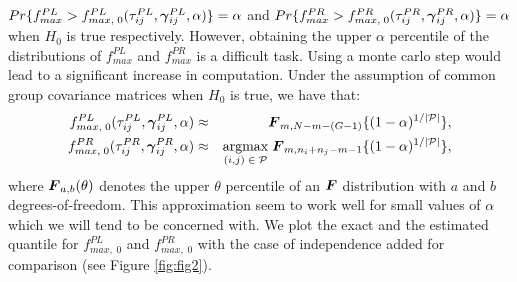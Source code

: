\documentclass[times,sort&compress,3p]{elsarticle}
\theoremstyle{plain}%
\theoremstyle{definition}
\def\be{\begin{eqnarray}}
\def\ee{\end{eqnarray}}
\newcommand{\uF}       {\mbox{\boldmath$F$}}
\newcommand{\ugamma}            {\mbox{\boldmath$\gamma$}}
\begin{document}
$Pr\{f^{PL}_{max} > f^{PL}_{max,\;0}(\tau^{PL}_{ij},\ugamma^{PL}_{ij}, \alpha)\} = \alpha$ and $Pr\{f^{PR}_{max} > f^{PR}_{max,\;0}(\tau^{PR}_{ij},\ugamma^{PR}_{ij}, \alpha)\} = \alpha$ when $H_{0}$ is true respectively. However, obtaining the upper $\alpha$ percentile of the distributions of $f^{PL}_{max}$ and $f^{PR}_{max}$ is a difficult task. Using a monte carlo step would lead to a significant increase in computation. Under the assumption of common group covariance matrices when $H_0$ is true, we have that: 
\be
 f^{PL}_{max,\;0}(\tau^{PL}_{ij},\ugamma^{PL}_{ij}, \alpha) &\approx& \uF_{m, N -m -(G-1)}\{(1 - \alpha)^{1/|\mathcal{P}|}\}, \nonumber\\
 f^{PR}_{max,\;0}(\tau^{PR}_{ij},\ugamma^{PR}_{ij}, \alpha) &\approx& \underset{(i,j)\; \in\; %
 \mathcal{P}}{\mathrm{argmax}}\; \uF_{m, n_{i}+n_{j} -m -1}\{ (1 -\alpha)^{1/|\mathcal{P}|}\}, \nonumber
 \ee
where $\uF_{a, b}(\theta)$ denotes the upper $\theta$ percentile of an $\uF$ distribution with $a$ and $b$ degrees-of-freedom. This approximation seem to work well for small values of $\alpha$ which we will tend to be concerned with. We plot the exact and the estimated quantile for $f^{PL}_{max,\;0}$ and $f^{PR}_{max,\;0}$ with the case of independence added for comparison (see Figure \ref{fig:fig2}).

\end{document}
